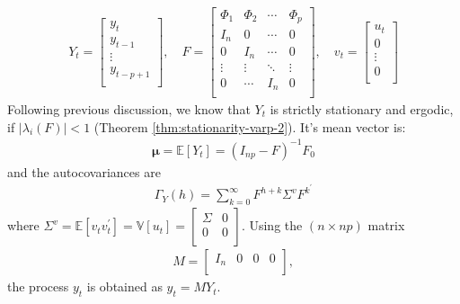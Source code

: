 \begin{gather*}
    Y_t = \begin{bmatrix}
            y_t \\
            y_{t-1} \\
            \vdots \\
            y_{t-p+1} \\
         \end{bmatrix}, \quad 
    F = \begin{bmatrix}
            \Phi_1 & \Phi_2 & \cdots & \Phi_p \\
            I_n & 0 & \cdots & 0 \\
            0 & I_n & \cdots & 0 \\
            \vdots & \vdots & \ddots & \vdots \\
            0 & \cdots & I_n & 0 \\
        \end{bmatrix}, \quad
    v_t = \begin{bmatrix}
            u_t \\
            0 \\
            \vdots \\
            0 \\
        \end{bmatrix}
\end{gather*}
Following previous discussion, we know that $Y_t$ is strictly stationary and ergodic,
if $\vert \lambda_i(F) \vert < 1$ (Theorem \ref{thm:stationarity-varp-2}).
It's mean vector is:
\begin{gather*}
    \mathbf{\mu} = \mathbb{E}[Y_t] = \left(I_{np} - F\right)^{-1} F_0
\end{gather*}
and the autocovariances are
\begin{gather*}
    \Gamma_Y(h) = \sum_{k=0}^{\infty} F^{h+k} \Sigma^v F^{k^{\prime}}
\end{gather*}
where $\Sigma^v = \mathbb{E}[v_t v_t^{\prime}] = \mathbb{V}[u_t] = \begin{bmatrix}
    \Sigma & 0 \\
    0 & 0 \\
\end{bmatrix}$.
Using the $(n \times np)$ matrix
\begin{gather*}
    M = \begin{bmatrix}
        I_n & 0 & 0 & 0 \\
    \end{bmatrix},
\end{gather*}
the process $y_t$ is obtained as $y_t = M Y_t$.

